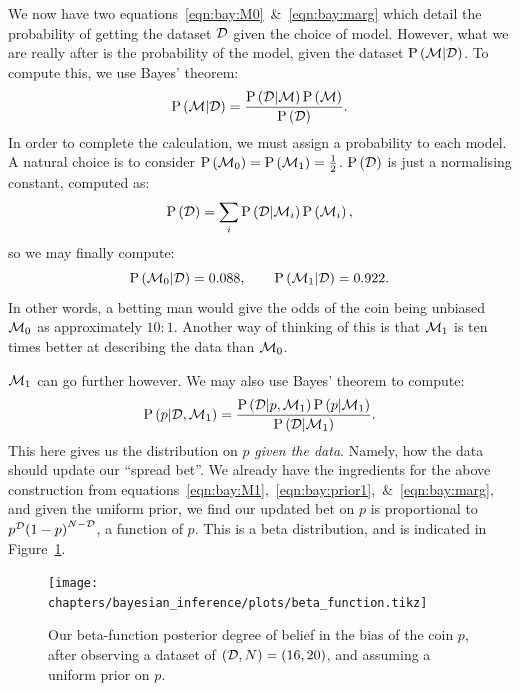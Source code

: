 We now have two equations~\eqref{eqn:bay:M0}~\&~\eqref{eqn:bay:marg} which detail the probability of getting the dataset \(\mathcal{D}\) given the choice of model. However, what we are really after is the probability of the model, given the dataset \(\mathrm{P}\left(\mathcal{M}\middle|\mathcal{D}\right)\). To compute this, we use Bayes' theorem:
\begin{equation}
  \mathrm{P}\left(\mathcal{M}\middle|\mathcal{D}\right) = \frac{\mathrm{P}\left(\mathcal{D}\middle|\mathcal{M}\right)\mathrm{P}\left(\mathcal{M}\right)}{\mathrm{P}\left(\mathcal{D}\right)}.
  \label{eqn:bay:bay_md}
\end{equation}
In order to complete the calculation, we must assign a probability to each model. A natural choice is to consider \(\mathrm{P}\left(\mathcal{M}_0\right)=\mathrm{P}\left(\mathcal{M}_1\right)=\frac{1}{2}\). \(\mathrm{P}\left(\mathcal{D}\right)\) is just a normalising constant, computed as:
\begin{equation}
  \mathrm{P}\left(\mathcal{D}\right) = \sum_i \mathrm{P}\left(\mathcal{D}\middle|\mathcal{M}_i\right)\mathrm{P}\left(\mathcal{M}_i\right), 
  \label{eqn:bay:norm}
\end{equation}
so we may finally compute:
\begin{equation}
  \mathrm{P}\left(\mathcal{M}_0\middle|\mathcal{D}\right) = 0.088, \qquad
  \mathrm{P}\left(\mathcal{M}_1\middle|\mathcal{D}\right) = 0.922.
  \label{eqn:bay:comp}
\end{equation}
In other words, a betting man would give the odds of the coin being unbiased \(\mathcal{M}_0\) as approximately \(10:1\). Another way of thinking of this is that \(\mathcal{M}_1\) is ten times better at describing the data than \(\mathcal{M}_0\).

\(\mathcal{M}_1\) can go further however. We may also use Bayes' theorem to compute:
\begin{equation}
  \mathrm{P}\left(p\middle|\mathcal{D},\mathcal{M}_1\right) = \frac{\mathrm{P}\left(\mathcal{D}\middle|p,\mathcal{M}_1\right)\mathrm{P}\left(p\middle|\mathcal{M}_1\right)}{\mathrm{P}\left(\mathcal{D}\middle|\mathcal{M}_1\right)}.
  \label{eqn:bay:bay_p}
\end{equation}
This here gives us the distribution on \(p\) {\em given the data}. Namely, how the data should update our ``spread bet''. We already have the ingredients for the above construction from equations~\eqref{eqn:bay:M1},~\eqref{eqn:bay:prior1},~\&~\eqref{eqn:bay:marg}, and given the uniform prior, we find our updated bet on \(p\) is proportional to \(p^{\mathcal{D}}{(1-p)}^{N-\mathcal{D}}\), a function of \(p\). This is a beta distribution, and is indicated in Figure~\ref{fig:bay:beta}.

\begin{figure}[tp]
  \centering
  \texttt{[image: chapters/bayesian\_inference/plots/beta\_function.tikz]}
  \caption{%
  Our beta-function posterior degree of belief in the bias of the coin \(p\), after observing a dataset of \((\mathcal{D},N)=(16,20)\), and assuming a uniform prior on \(p\).\label{fig:bay:beta}
}
\end{figure}

